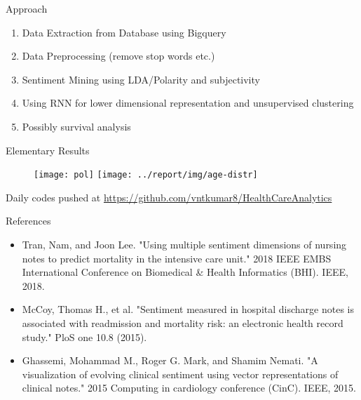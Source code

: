 \documentclass[11pt]{beamer}
\begin{document}
\begin{frame}{Approach}
\begin{enumerate}
	\item Data Extraction from Database using Bigquery
	\item Data Preprocessing (remove stop words etc.)
	\item Sentiment Mining using LDA/Polarity and subjectivity
	\item Using RNN for lower dimensional representation and unsupervised clustering
	\item Possibly survival analysis 
\end{enumerate}
\end{frame}
\begin{frame}{Elementary Results}
	\begin{figure}
		\centering
		\texttt{[image: pol]}		\texttt{[image: ../report/img/age-distr]}
		\label{fig:pol}
	\end{figure}
Daily codes pushed at \url{https://github.com/vntkumar8/HealthCareAnalytics}
\end{frame}




\begin{frame}{References}
	\begin{itemize}
		\item Tran, Nam, and Joon Lee. "Using multiple sentiment dimensions of nursing notes to predict mortality in the intensive care unit." 2018 IEEE EMBS International Conference on Biomedical \& Health Informatics (BHI). IEEE, 2018.
		\item McCoy, Thomas H., et al. "Sentiment measured in hospital discharge notes is associated with readmission and mortality risk: an electronic health record study." PloS one 10.8 (2015).
		\item Ghassemi, Mohammad M., Roger G. Mark, and Shamim Nemati. "A visualization of evolving clinical sentiment using vector representations of clinical notes." 2015 Computing in cardiology conference (CinC). IEEE, 2015.
		
	\end{itemize}
\end{frame}
\end{document}
